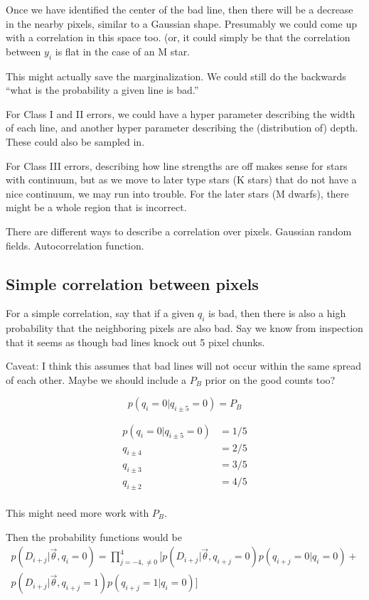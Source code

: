 \documentclass[preprint]{aastex} %
\newcommand{\vt}{\vec{\theta}}
\begin{document}
Once we have identified the center of the bad line, then there will be a decrease in the nearby pixels, similar to a Gaussian shape. Presumably we could come up with a correlation in this space too. (or, it could simply be that the correlation between $y_i$ is flat in the case of an M star.

This might actually save the marginalization. We could still do the backwards ``what is the probability a given line is bad.''

For Class I and II errors, we could have a hyper parameter describing the width of each line, and another hyper parameter describing the (distribution of) depth. These could also be sampled in.

For Class III errors, describing how line strengths are off makes sense for stars with continuum, but as we move to later type stars (K stars) that do not have a nice continuum, we may run into trouble. For the later stars (M dwarfs), there might be a whole region that is incorrect.

There are different ways to describe a correlation over pixels. Gaussian random fields. Autocorrelation function.

\subsection{Simple correlation between pixels}
For a simple correlation, say that if a given $q_i$ is bad, then there is also a high probability that the neighboring pixels are also bad. Say we know from inspection that it seems as though bad lines knock out 5 pixel chunks. 


Caveat: I think this assumes that bad lines will not occur within the same spread of each other. Maybe we should include a $P_B$ prior on the good counts too?

\begin{equation}
  p(q_i = 0 | q_{i \pm 5} = 0) = P_B
\end{equation}

\begin{align}
 p(q_i = 0 | q_{i \pm 5} = 0) &= 1/5 \\
 q_{i \pm 4} &= 2/5 \\
 q_{i \pm 3} &= 3/5 \\
 q_{i \pm 2} &= 4/5 \\
\end{align} 

This might need more work with $P_B$.

Then the probability functions would be
\begin{multline}
  p(D_{i + j} | \vt, q_i =0) = \prod_{j = -4, \ne 0}^4 \bigl [ p(D_{i+j} | \vt, q_{i +j}=0) p(q_{i+j} = 0 | q_i=0) + \\
    p(D_{i + j} | \vt, q_{i + j} = 1) p(q_{i +j} = 1 | q_i = 0) \bigr ]
\end{multline}
\end{document}
